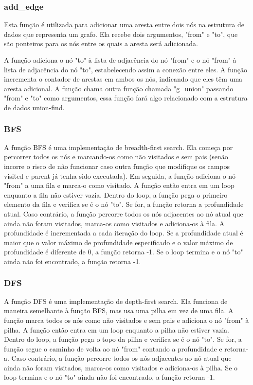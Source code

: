 \documentclass[a4paper,11pt]{article}
\begin{document}
    \subsubsection{add\_edge}
    Esta função é utilizada para adicionar uma aresta entre dois nós na estrutura de dados que representa um grafo. Ela recebe dois argumentos, "from" e "to", que são ponteiros para os nós entre os quais a aresta será adicionada.

    A função adiciona o nó "to" à lista de adjacência do nó "from" e o nó "from" à lista de adjacência do nó "to", estabelecendo assim a conexão entre eles.
    A função incrementa o contador de arestas em ambos os nós, indicando que eles têm uma aresta adicional.
    A função chama outra função chamada "g\_union" passando "from" e "to" como argumentos, essa função fará algo relacionado com a estrutura de dados union-find.

    \subsubsection{BFS}
    A função BFS é uma implementação de breadth-first search. Ela começa por percorrer todos os nós e marcando-os como não visitados e sem pais (senão incorre o risco de não funcionar caso outra função que modifique os campos visited e parent já tenha sido executada). Em seguida, a função adiciona o nó "from" a uma fila e marca-o como visitado. A função então entra em um loop enquanto a fila não estiver vazia. Dentro do loop, a função pega o primeiro elemento da fila e verifica se é o nó "to". Se for, a função retorna a profundidade atual. Caso contrário, a função percorre todos os nós adjacentes ao nó atual que ainda não foram visitados, marca-os como visitados e adiciona-os à fila. A profundidade é incrementada a cada iteração do loop. Se a profundidade atual é maior que o valor máximo de profundidade especificado e o valor máximo de profundidade é diferente de 0, a função retorna -1. Se o loop termina e o nó "to" ainda não foi encontrado, a função retorna -1.

    \subsubsection{DFS}
    A função DFS é uma implementação de depth-first search. Ela funciona de maneira semelhante à função BFS, mas usa uma pilha em vez de uma fila. A função marca todos os nós como não visitados e sem pais e adiciona o nó "from" à pilha. A função então entra em um loop enquanto a pilha não estiver vazia. Dentro do loop, a função pega o topo da pilha e verifica se é o nó "to". Se for, a função segue o caminho de volta ao nó "from" contando a profundidade e retorna-a. Caso contrário, a função percorre todos os nós adjacentes ao nó atual que ainda não foram visitados, marca-os como visitados e adiciona-os à pilha. Se o loop termina e o nó "to" ainda não foi encontrado, a função retorna -1.
    
\end{document}
